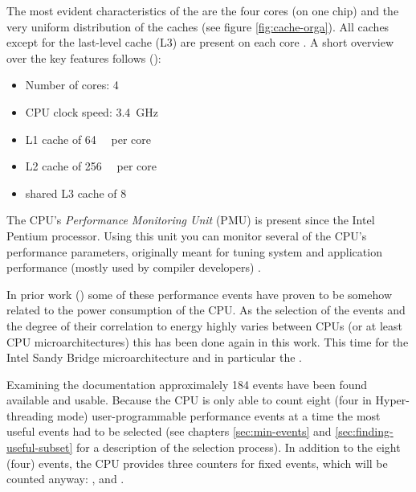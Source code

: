 The most evident characteristics of the \JWPcpu{} are the four cores (on one
chip) and the very uniform distribution of the caches (see figure
\ref{fig:cache-orga}). All caches except for the last-level cache (L3) are
present on each core \cite{fog11}. A short overview over the key features
follows (\cite{intel2011spec}):

\begin{itemize}

\item Number of cores: 4

\item CPU clock speed: \SI{3.4}{\giga\hertz}

\item L1 cache of \SI{64}{\kibi\byte} per core\cite{intel2011softdev1}

\item L2 cache of \SI{256}{\kibi\byte} per core\cite{intel2011softdev1}

\item shared L3 cache of \SI{8}{\mebi\byte}\cite{intel2011softdev1}

\end{itemize}


\label{sec:pmu}

The CPU's \emph{Performance Monitoring Unit} (PMU) is present since the
Intel\TReg{} Pentium processor. Using this unit you can monitor several
of the CPU's performance parameters, originally meant for tuning system and
application performance (mostly used by compiler developers)
\cite{intel2011softdev3b}.

In prior work (\cite{bellosa2000benefits,snowdon2010operating,
weissel2002process,kellner03tempcontrol,bertran2010decomposable}) some of these
performance events have proven to be somehow related to the power consumption of
the CPU. As the selection of the events and the degree of their correlation to
energy highly varies between CPUs (or at least CPU microarchitectures) this has
been done again in this work. This time for the Intel\TReg{} Sandy Bridge
microarchitecture and in particular the \JWPcpu{}.

Examining the documentation \cite{intel2011events} approximalely 184 events have
been found available and usable. Because the CPU is only able to count eight
(four in Hyper-threading \cite{wiki:HT} mode) user-programmable performance
events at a time \cite{intel2011softdev1} the most useful events had to be
selected (see chapters \ref{sec:min-events} and \ref{sec:finding-useful-subset}
for a description of  the selection process). In addition to the eight (four)
events, the CPU provides three counters for fixed events, which will be counted
anyway: , 
and .

